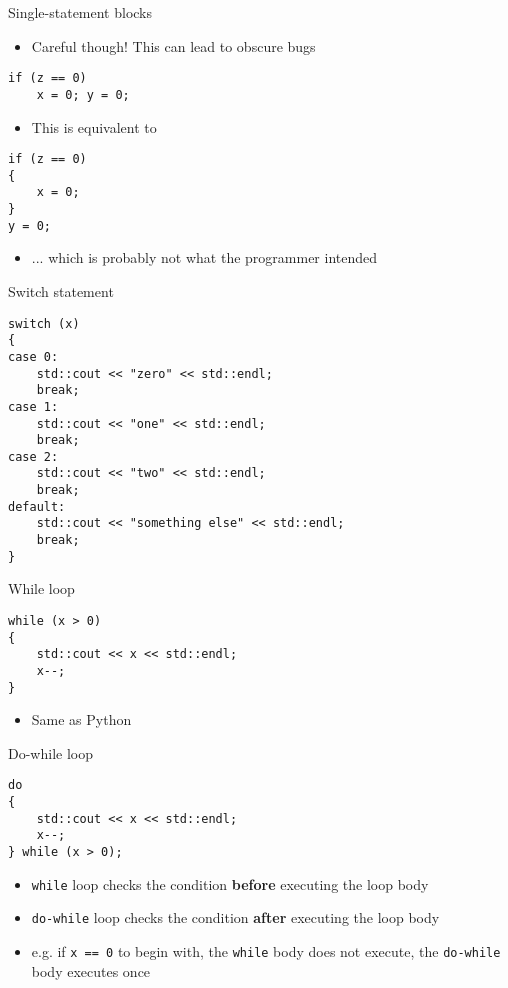 \begin{frame}[fragile]{Single-statement blocks}
    \begin{itemize}
        \item Careful though! This can lead to obscure bugs
    \end{itemize}
    \begin{lstlisting}
if (z == 0)
    x = 0; y = 0;
    \end{lstlisting}
    \pause
    \begin{itemize}
        \item This is equivalent to
    \end{itemize}
    \begin{lstlisting}
if (z == 0)
{
    x = 0;
}
y = 0;
    \end{lstlisting}
    \begin{itemize}
        \item ... which is probably not what the programmer intended
    \end{itemize}
\end{frame}

\begin{frame}[fragile]{Switch statement}
	\begin{lstlisting}
switch (x)
{
case 0:
    std::cout << "zero" << std::endl;
    break;
case 1:
    std::cout << "one" << std::endl;
    break;
case 2:
    std::cout << "two" << std::endl;
    break;
default:
    std::cout << "something else" << std::endl;
    break;
}
	\end{lstlisting}
\end{frame}

\begin{frame}[fragile]{While loop}
	\begin{lstlisting}
while (x > 0)
{
    std::cout << x << std::endl;
    x--;
}
	\end{lstlisting}
    \begin{itemize}
        \item Same as Python
    \end{itemize}
\end{frame}

\begin{frame}[fragile]{Do-while loop}
	\begin{lstlisting}
do
{
    std::cout << x << std::endl;
    x--;
} while (x > 0);
	\end{lstlisting}
	\pause
	\begin{itemize}
		\item \lstinline{while} loop checks the condition \textbf{before} executing the loop body \pause
		\item \lstinline{do-while} loop checks the condition \textbf{after} executing the loop body \pause
		\item e.g. if \lstinline{x == 0} to begin with, the \lstinline{while} body does not execute, the \lstinline{do-while} body executes once
	\end{itemize}
\end{frame}


